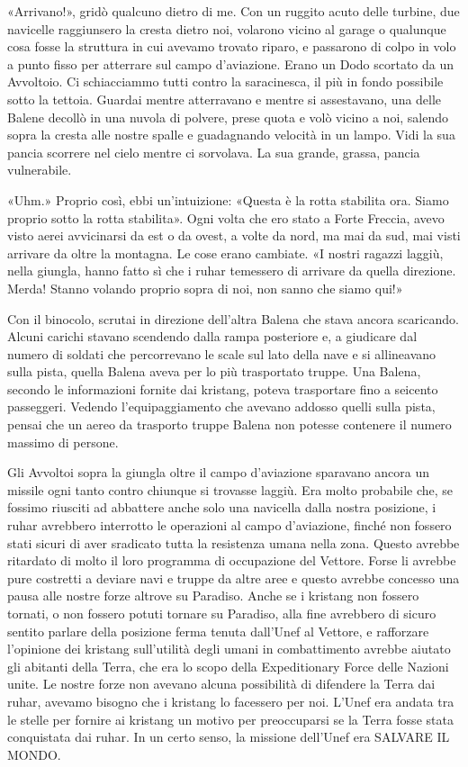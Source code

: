 «Arrivano!», gridò qualcuno dietro di me. Con un ruggito acuto delle
turbine, due navicelle raggiunsero la cresta dietro noi, volarono vicino
al garage o qualunque cosa fosse la struttura in cui avevamo trovato
riparo, e passarono di colpo in volo a punto fisso per atterrare sul
campo d'aviazione. Erano un Dodo scortato da un Avvoltoio. Ci
schiacciammo tutti contro la saracinesca, il più in fondo possibile
sotto la tettoia. Guardai mentre atterravano e mentre si assestavano,
una delle Balene decollò in una nuvola di polvere, prese quota e volò
vicino a noi, salendo sopra la cresta alle nostre spalle e guadagnando
velocità in un lampo. Vidi la sua pancia scorrere nel cielo mentre ci
sorvolava. La sua grande, grassa, pancia vulnerabile.

«Uhm.» Proprio così, ebbi un'intuizione: «Questa è la rotta stabilita
ora. Siamo proprio sotto la rotta stabilita». Ogni volta che ero stato a
Forte Freccia, avevo visto aerei avvicinarsi da est o da ovest, a volte
da nord, ma mai da sud, mai visti arrivare da oltre la montagna. Le cose
erano cambiate. «I nostri ragazzi laggiù, nella giungla, hanno fatto sì
che i ruhar temessero di arrivare da quella direzione. Merda! Stanno
volando proprio sopra di noi, non sanno che siamo qui!»

Con il binocolo, scrutai in direzione dell'altra Balena che stava ancora
scaricando. Alcuni carichi stavano scendendo dalla rampa posteriore e, a
giudicare dal numero di soldati che percorrevano le scale sul lato della
nave e si allineavano sulla pista, quella Balena aveva per lo più
trasportato truppe. Una Balena, secondo le informazioni fornite dai
kristang, poteva trasportare fino a seicento passeggeri. Vedendo
l'equipaggiamento che avevano addosso quelli sulla pista, pensai che un
aereo da trasporto truppe Balena non potesse contenere il numero massimo
di persone.

Gli Avvoltoi sopra la giungla oltre il campo d'aviazione sparavano
ancora un missile ogni tanto contro chiunque si trovasse laggiù. Era
molto probabile che, se fossimo riusciti ad abbattere anche solo una
navicella dalla nostra posizione, i ruhar avrebbero interrotto le
operazioni al campo d'aviazione, finché non fossero stati sicuri di aver
sradicato tutta la resistenza umana nella zona. Questo avrebbe ritardato
di molto il loro programma di occupazione del Vettore. Forse li avrebbe
pure costretti a deviare navi e truppe da altre aree e questo avrebbe
concesso una pausa alle nostre forze altrove su Paradiso. Anche se i
kristang non fossero tornati, o non fossero potuti tornare su Paradiso,
alla fine avrebbero di sicuro sentito parlare della posizione ferma
tenuta dall'Unef al Vettore, e rafforzare l'opinione dei kristang
sull'utilità degli umani in combattimento avrebbe aiutato gli abitanti
della Terra, che era lo scopo della Expeditionary Force delle Nazioni
unite. Le nostre forze non avevano alcuna possibilità di difendere la
Terra dai ruhar, avevamo bisogno che i kristang lo facessero per noi.
L'Unef era andata tra le stelle per fornire ai kristang un motivo per
preoccuparsi se la Terra fosse stata conquistata dai ruhar. In un certo
senso, la missione dell'Unef era SALVARE IL MONDO.

